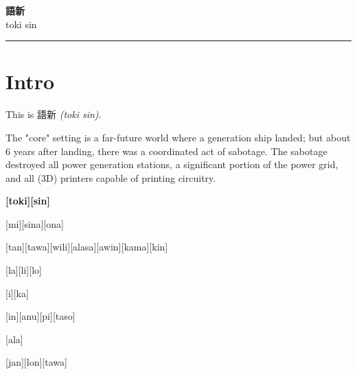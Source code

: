 \documentclass{ctexart}
\begin{document}
\begin{center}
    \vspace*{2cm}
    {\Huge\bfseries\color{primary}\textCJKserif{} 語新}\\
    \vspace{0.5cm}
    {\Large\textserif{} toki sin}\\
    \vspace{1cm}
\end{center}
\vspace{1cm}
\hrule
\vspace{1cm}


\section{Intro}
This is 語新 {\it{}(toki sin)}.

The "core" setting is a far-future world where a generation ship landed;
but about 6 years after landing, there was a coordinated act of sabotage.
The sabotage destroyed all power generation stations, a significant portion
of the power grid, and all (3D) printers capable of printing circuitry.


\textbf{[toki][sin]}


[mi][sina][ona]

[tan][tawa][wili][alasa][awin][kama][kin]

[la][li][lo]

[i][ka]

[in][anu][pi][taso]

[ala]

[jan][lon][tawa]


\newpage
\section[人去ら]{}
\end{document}
